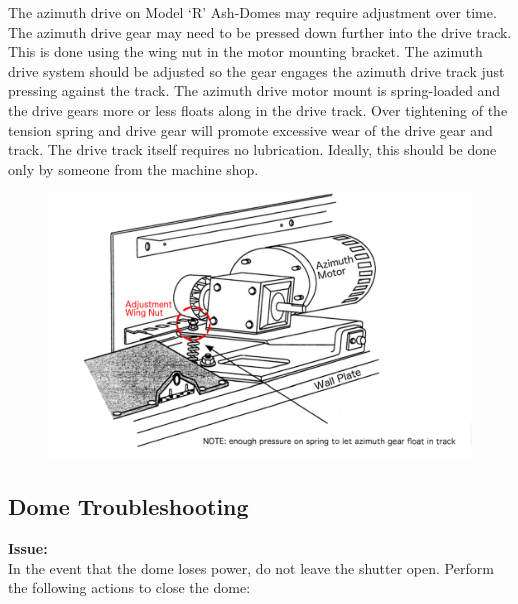 \documentclass[12pt,titlepage]{article}
\begin{document}
The azimuth drive on Model ‘R’ Ash-Domes may require adjustment over time.
The azimuth drive gear may need to be pressed down further into the drive track.
This is done using the wing nut in the motor mounting bracket.
The azimuth drive system should be adjusted so the gear engages the azimuth drive track just pressing against the track.
The azimuth drive motor mount is spring-loaded and the drive gears more or less floats along in the drive track.
Over tightening of the tension spring and drive gear will promote excessive wear of the drive gear and track.
The drive track itself requires no lubrication.
Ideally, this should be done only by someone from the machine shop.
\begin{figure}[H] 
	\begin{center}
		\includegraphics[width=.8\textwidth]{./images/dome/azimuth_motor_wide.png} 
		\label{azimuth_motor}
	\end{center}
\end{figure}

\subsection{Dome Troubleshooting}\label{ssec:dome_trouble}
\noindent\textbf{Issue:}\\
In the event that the dome loses power, do not leave the shutter open. Perform the following actions to close the dome:
\end{document}

